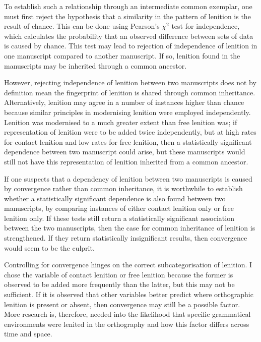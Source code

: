 To  establish such a relationship through an intermediate common exemplar, one must first reject the hypothesis that a similarity in the pattern of lenition is the result of chance. This can be done using Pearson's \(\chi^2\) test for independence, which calculates the probability that an observed difference between sets of data is caused by chance. This test may lead to rejection of independence of lenition in one manuscript compared to another manuscript. If so, lenition found in the manuscripts may be inherited through a common ancestor.

However, rejecting independence of lenition between two manuscripts does not by definition mean the fingerprint of lenition is shared through common inheritance. Alternatively, lenition may agree in a number of instances higher than chance because similar principles in modernising lenition were employed independently. Lenition was modernised to a much greater extent than free lenition was; if representation of lenition were to be added twice independently, but at high rates for contact lenition and low rates for free lenition, then a statistically significant dependence between two manuscript could arise, but these manuscripts would still not have this representation of lenition inherited from a common ancestor.

If one suspects that a dependency of lenition between two manuscripts is caused by convergence rather than common inheritance, it is worthwhile to establish whether a statistically significant dependence is also found between two manuscripts, by comparing instances of either contact lenition only or free lenition only. If these tests still return a statistically significant association between the two manuscripts, then the case for common inheritance of lenition is strengthened. If they return statistically insignificant results, then convergence would seem to be the culprit.

Controlling for convergence hinges on the correct subcategorisation of lenition. I chose the variable of contact lenition or free lenition because the former is observed to be added more frequently than the latter, but this may not be sufficient. If it is observed that other variables better predict where orthographic lenition is present or absent, then convergence may still be a possible factor. More research is, therefore, needed into the likelihood that specific grammatical environments were lenited in the orthography and how this factor differs across time and space.

